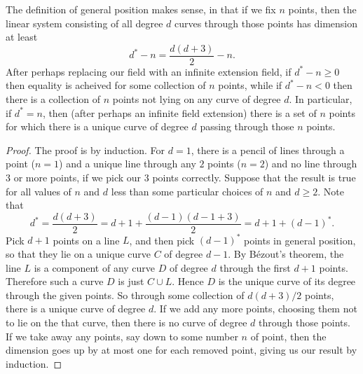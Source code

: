 \begin{lemma}\label{lemma:general.position.defined}
The definition of general position makes sense, in that if we fix \(n\) points, then the linear system consisting of all degree \(d\) curves through those points has dimension at least 
\[
d^*-n=\frac{d(d+3)}{2}-n.
\]
After perhaps replacing our field with an infinite extension field, if \(d^*-n \ge 0 \) then equality is acheived for some collection of \(n\) points, while if \(d^*-n<0\) then there is a collection of \(n\) points not lying on any curve of degree \(d\).
In particular, if \(d^*=n\), then (after perhaps an infinite field extension) there is a set of \(n\) points for which there is a unique curve of degree \(d\) passing through those \(n\) points.
\end{lemma}
\begin{proof}
The proof is by induction.
For \(d=1\), there is a pencil of lines through a point (\(n=1\)) and a unique line through any \(2\) points (\(n=2\)) and no line through \(3\) or more points, if we pick our \(3\) points correctly.
Suppose that the result is true for all values of \(n\) and \(d\) less than some particular choices of \(n\) and \(d \ge 2\).
Note that 
\[
d^*=\frac{d(d+3)}{2} = d+1+\frac{(d-1)(d-1+3)}{2} = d+1+(d-1)^*.
\]
Pick \(d+1\) points on a line \(L\), and then pick \((d-1)^*\) points in general position, so that they lie on a unique curve \(C\) of degree \(d-1\).
By B\'ezout's theorem, the line \(L\) is a component of any curve \(D\) of degree \(d\) through the first \(d+1\) points.
Therefore such a curve \(D\) is just \(C \cup L\).
Hence \(D\) is the unique curve of its degree through the given points.
So through some collection of \(d(d+3)/2\) points, there is a unique curve of degree \(d\).
If we add any more points, choosing them not to lie on the that curve, then there is no curve of degree \(d\) through those points.
If we take away any points, say down to some number \(n\) of point, then the dimension goes up by at most one for each removed point, giving us our result by induction.
\end{proof}
 
